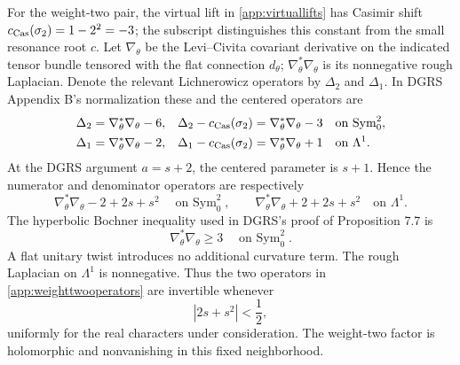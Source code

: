 \documentclass[11pt,letterpaper,reqno]{amsart}
\theoremstyle{remark}
\begin{document}
For the weight-two pair, the virtual lift in
\eqref{app:virtuallifts} has Casimir shift
$c_{\rm Cas}(\sigma_2)=1-2^2=-3$; the subscript distinguishes this
constant from the small resonance root $c$.
Let $\nabla_\theta$ be the Levi--Civita covariant derivative on the
indicated tensor bundle tensored with the flat connection $d_\theta$;
$\nabla_\theta^*\nabla_\theta$ is its nonnegative rough Laplacian.
Denote the relevant Lichnerowicz operators by $\Delta_2$ and $\Delta_1$.
In DGRS Appendix B's normalization these and the centered operators are
\begin{align}\label{app:casimirshifts}
 \Delta_2&=\nabla_\theta^*\nabla_\theta-6,
 &\Delta_2-c_{\rm Cas}(\sigma_2)&=\nabla_\theta^*\nabla_\theta-3
 &&\text{on $\operatorname{Sym}^2_0$},\notag\\
 \Delta_1&=\nabla_\theta^*\nabla_\theta-2,
 &\Delta_1-c_{\rm Cas}(\sigma_2)&=\nabla_\theta^*\nabla_\theta+1
 &&\text{on $\Lambda^1$}.
\end{align}
At the DGRS argument $a=s+2$, the centered parameter is $s+1$.
Hence the numerator and denominator operators are respectively
\begin{equation}\label{app:weighttwooperators}
 \nabla_\theta^*\nabla_\theta-2+2s+s^2
       \quad\text{on $\operatorname{Sym}^2_0$},
 \qquad
 \nabla_\theta^*\nabla_\theta+2+2s+s^2
       \quad\text{on $\Lambda^1$}.
\end{equation}
The hyperbolic Bochner inequality used in DGRS's proof of Proposition
7.7 is
\begin{equation}\label{app:bochner}
 \nabla_\theta^*\nabla_\theta\geq3
        \quad\text{on $\operatorname{Sym}^2_0$}.
\end{equation}
A flat unitary twist introduces no additional curvature term. The
rough Laplacian on $\Lambda^1$ is nonnegative. Thus the two operators
in \eqref{app:weighttwooperators} are invertible whenever
\begin{equation}\label{app:weighttwodisk}
 |2s+s^2|<\frac12,
\end{equation}
uniformly for the real characters under consideration. The weight-two
factor is holomorphic and nonvanishing in this fixed neighborhood.
\end{document}
